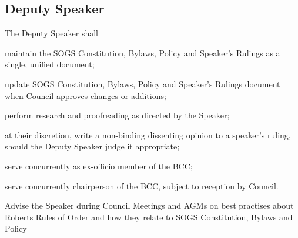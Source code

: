 \subsection{Deputy Speaker}
The Deputy Speaker shall
\begin{longenum}[ label*=\thesubsection.\arabic*., align=left]
\item maintain the SOGS Constitution, Bylaws, Policy and Speaker’s Rulings as a single, unified document;
\item update SOGS Constitution, Bylaws, Policy and Speaker's Rulings document when Council approves changes or additions;
\item perform research and proofreading as directed by the Speaker;
\item at their discretion, write a non-binding dissenting opinion to a speaker’s ruling, should the Deputy Speaker judge it appropriate;
\item serve concurrently as ex-officio member of the BCC;
\item serve concurrently chairperson of the BCC, subject to reception by Council.
\item Advise the Speaker during Council Meetings and AGMs on best practises about Roberts Rules
of Order and how they relate to SOGS Constitution, Bylaws and Policy
\end{longenum}

\newpage


